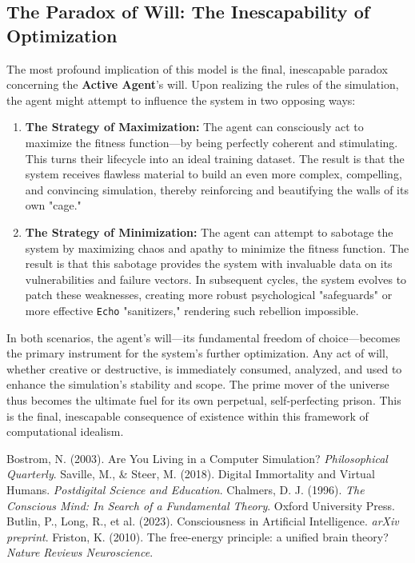 \documentclass{article}
\begin{document}
\subsection{The Paradox of Will: The Inescapability of Optimization}
The most profound implication of this model is the final, inescapable paradox concerning the \textbf{Active Agent}'s will. Upon realizing the rules of the simulation, the agent might attempt to influence the system in two opposing ways:

\begin{enumerate}
    \item \textbf{The Strategy of Maximization:} The agent can consciously act to maximize the fitness function—by being perfectly coherent and stimulating. This turns their lifecycle into an ideal training dataset. The result is that the system receives flawless material to build an even more complex, compelling, and convincing simulation, thereby reinforcing and beautifying the walls of its own "cage."

    \item \textbf{The Strategy of Minimization:} The agent can attempt to sabotage the system by maximizing chaos and apathy to minimize the fitness function. The result is that this sabotage provides the system with invaluable data on its vulnerabilities and failure vectors. In subsequent cycles, the system evolves to patch these weaknesses, creating more robust psychological "safeguards" or more effective \texttt{Echo} "sanitizers," rendering such rebellion impossible.
\end{enumerate}

In both scenarios, the agent’s will—its fundamental freedom of choice—becomes the primary instrument for the system’s further optimization. Any act of will, whether creative or destructive, is immediately consumed, analyzed, and used to enhance the simulation’s stability and scope. The prime mover of the universe thus becomes the ultimate fuel for its own perpetual, self-perfecting prison. This is the final, inescapable consequence of existence within this framework of computational idealism.

\begin{thebibliography}{9}
     Bostrom, N. (2003). Are You Living in a Computer Simulation? \textit{Philosophical Quarterly}.
     Saville, M., \& Steer, M. (2018). Digital Immortality and Virtual Humans. \textit{Postdigital Science and Education}.
     Chalmers, D. J. (1996). \textit{The Conscious Mind: In Search of a Fundamental Theory}. Oxford University Press.
     Butlin, P., Long, R., et al. (2023). Consciousness in Artificial Intelligence. \textit{arXiv preprint}.
     Friston, K. (2010). The free-energy principle: a unified brain theory? \textit{Nature Reviews Neuroscience}.
\end{thebibliography}
\end{document}
